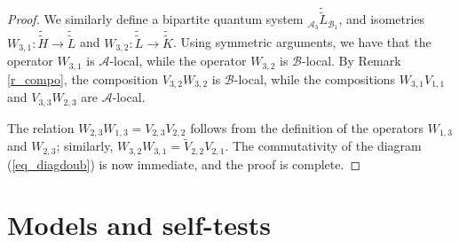 \documentclass[11pt]{amsart}
\theoremstyle{definition}
\newcommand{\cl}[1]{\mathcal{#1}}
\providecommand{\wt}[1]{\widetilde{#1}}
\begin{document}
\begin{proof}
We similarly define a bipartite quantum system 
$\mbox{}_{\cl{A}_3}\wt{\wt{{L}}}_{\cl{B}_1}$, and isometries 
$W_{3,1} : \wt{\wt{{H}}}\to \wt{\wt{{L}}}$ and 
$W_{3,2} : \wt{\wt{{L}}}\to \wt{\wt{{K}}}$. Using 
symmetric arguments, we have that the operator
$W_{3,1}$ is $\cl{A}$-local, while the operator 
$W_{3,2}$ is $\cl{B}$-local. 
By Remark \ref{r_compo}, 
the composition $V_{3,2}W_{3,2}$ is $\cl{B}$-local, while 
the compositions $W_{3,1}V_{1,1}$ and $V_{3,3}W_{2,3}$ are $\cl{A}$-local. 

The relation $W_{2,3}W_{1,3} = V_{2,3}V_{2,2}$ follows from the definition 
of the operators $W_{1,3}$ and $W_{2,3}$; similarly, 
$W_{3,2}W_{3,1} = \wt{V}_{2,2}V_{2,1}$. 
The commutativity of the diagram (\ref{eq_diagdoub})
is now immediate, and the proof is complete.
\end{proof}




\section{Models and self-tests}\label{s_models}
\end{document}
